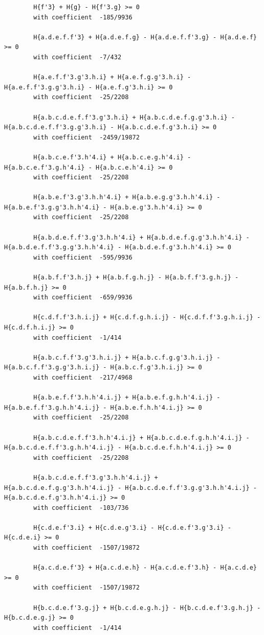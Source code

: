 \documentclass[11pt, a4paper]{kybernetika}
\begin{document}
\begin{verbatim}
		H{f'3} + H{g} - H{f'3.g} >= 0
		with coefficient  -185/9936
		
		H{a.d.e.f.f'3} + H{a.d.e.f.g} - H{a.d.e.f.f'3.g} - H{a.d.e.f} >= 0
		with coefficient  -7/432
		
		H{a.e.f.f'3.g'3.h.i} + H{a.e.f.g.g'3.h.i} - H{a.e.f.f'3.g.g'3.h.i} - H{a.e.f.g'3.h.i} >= 0
		with coefficient  -25/2208
		
		H{a.b.c.d.e.f.f'3.g'3.h.i} + H{a.b.c.d.e.f.g.g'3.h.i} - H{a.b.c.d.e.f.f'3.g.g'3.h.i} - H{a.b.c.d.e.f.g'3.h.i} >= 0
		with coefficient  -2459/19872
		
		H{a.b.c.e.f'3.h'4.i} + H{a.b.c.e.g.h'4.i} - H{a.b.c.e.f'3.g.h'4.i} - H{a.b.c.e.h'4.i} >= 0
		with coefficient  -25/2208
		
		H{a.b.e.f'3.g'3.h.h'4.i} + H{a.b.e.g.g'3.h.h'4.i} - H{a.b.e.f'3.g.g'3.h.h'4.i} - H{a.b.e.g'3.h.h'4.i} >= 0
		with coefficient  -25/2208
		
		H{a.b.d.e.f.f'3.g'3.h.h'4.i} + H{a.b.d.e.f.g.g'3.h.h'4.i} - H{a.b.d.e.f.f'3.g.g'3.h.h'4.i} - H{a.b.d.e.f.g'3.h.h'4.i} >= 0
		with coefficient  -595/9936
		
		H{a.b.f.f'3.h.j} + H{a.b.f.g.h.j} - H{a.b.f.f'3.g.h.j} - H{a.b.f.h.j} >= 0
		with coefficient  -659/9936
		
		H{c.d.f.f'3.h.i.j} + H{c.d.f.g.h.i.j} - H{c.d.f.f'3.g.h.i.j} - H{c.d.f.h.i.j} >= 0
		with coefficient  -1/414
		
		H{a.b.c.f.f'3.g'3.h.i.j} + H{a.b.c.f.g.g'3.h.i.j} - H{a.b.c.f.f'3.g.g'3.h.i.j} - H{a.b.c.f.g'3.h.i.j} >= 0
		with coefficient  -217/4968
		
		H{a.b.e.f.f'3.h.h'4.i.j} + H{a.b.e.f.g.h.h'4.i.j} - H{a.b.e.f.f'3.g.h.h'4.i.j} - H{a.b.e.f.h.h'4.i.j} >= 0
		with coefficient  -25/2208
		
		H{a.b.c.d.e.f.f'3.h.h'4.i.j} + H{a.b.c.d.e.f.g.h.h'4.i.j} - H{a.b.c.d.e.f.f'3.g.h.h'4.i.j} - H{a.b.c.d.e.f.h.h'4.i.j} >= 0
		with coefficient  -25/2208
		
		H{a.b.c.d.e.f.f'3.g'3.h.h'4.i.j} + H{a.b.c.d.e.f.g.g'3.h.h'4.i.j} - H{a.b.c.d.e.f.f'3.g.g'3.h.h'4.i.j} - H{a.b.c.d.e.f.g'3.h.h'4.i.j} >= 0
		with coefficient  -103/736
		
		H{c.d.e.f'3.i} + H{c.d.e.g'3.i} - H{c.d.e.f'3.g'3.i} - H{c.d.e.i} >= 0
		with coefficient  -1507/19872
		
		H{a.c.d.e.f'3} + H{a.c.d.e.h} - H{a.c.d.e.f'3.h} - H{a.c.d.e} >= 0
		with coefficient  -1507/19872
		
		H{b.c.d.e.f'3.g.j} + H{b.c.d.e.g.h.j} - H{b.c.d.e.f'3.g.h.j} - H{b.c.d.e.g.j} >= 0
		with coefficient  -1/414
		

\end{verbatim}
\end{document}
